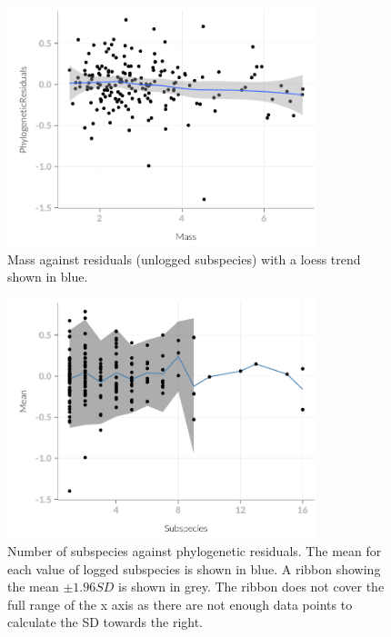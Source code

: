 \begin{knitrout}
\begin{figure}[t]

{\centering \includegraphics[width=0.8\textwidth]{figure/subsAnalysis-7} 

}

\caption[Mass against residuals  (unlogged subspecies) with a loess trend shown in blue]{Mass against residuals  (unlogged subspecies) with a loess trend shown in blue.}\label{fig:subsAnalysis}
\end{figure}

\begin{figure}[t]

{\centering \includegraphics[width=0.8\textwidth]{figure/subsAnalysis-8} 

}

\caption[Number of subspecies against phylogenetic residuals]{Number of subspecies against phylogenetic residuals. The mean for each value of logged subspecies is shown in blue. A ribbon showing the mean $\pm 1.96{SD}$ is shown in grey. The ribbon does not cover the full range of the x axis as there are not enough data points to calculate the SD towards the right.}\label{fig:subsAnalysis}
\end{figure}


\end{knitrout}
\clearpage







